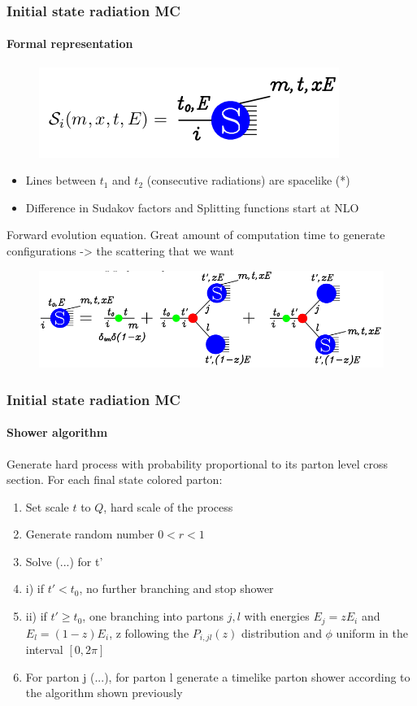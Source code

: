 \documentclass[aspectratio=43]{beamer}
\begin{document}
\begin{frame}
	
	\frametitle{Initial state radiation MC}
	\framesubtitle{Formal representation}
	
	\begin{figure}
		\includegraphics[width = 3 cm]{plots/shower_ISR_2.png}
	\end{figure}
	
	\begin{itemize} 
		\item \footnotesize Lines between $t_{1}$ and $t_{2}$ (consecutive radiations) are spacelike {\color{blue}(*)}
		\item \footnotesize Difference in Sudakov factors and Splitting functions start at NLO
	\end{itemize}
	
	\footnotesize Forward evolution equation. Great amount of computation time to generate configurations -> the scattering that we want
	\begin{figure}
		\includegraphics[width = 10 cm]{plots/shower_ISR_3.png}
	\end{figure}

\end{frame}

\begin{frame}

	\frametitle{Initial state radiation MC}
	\framesubtitle{Shower algorithm}
	
	Generate hard process with probability proportional to its parton level cross section. For each final state colored parton:
	\begin{enumerate} 
		\item Set scale $t$ to $Q$, hard scale of the process
		\item Generate random number $0 < r < 1$
		\item Solve (...) for t'
		\item i) if $t' < t_{0}$, no further branching and stop shower
		\item ii) if $t' \geq t_{0}$, one branching into partons $j, l$ with energies $E_{j} = zE_{i}$ and $E_{l} = (1 - z)E_{i}$, z following the $P_{i, jl}(z)$ distribution and $\phi$ uniform in the interval $[0, 2\pi]$
		\item For parton j (...), for parton l generate a timelike parton shower according to the algorithm shown previously
	\end{enumerate}

\end{frame}
\end{document}
